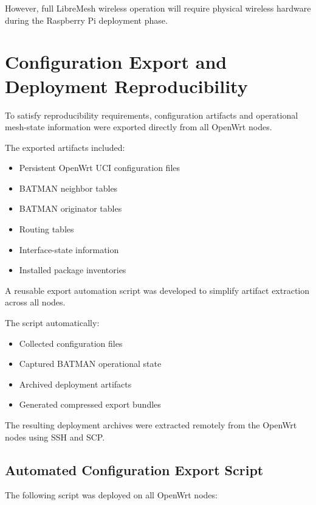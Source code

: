 \documentclass[conference]{IEEEtran}
\begin{document}
However, full LibreMesh wireless operation will require physical wireless hardware during the Raspberry Pi deployment phase.

\section{Configuration Export and Deployment Reproducibility}

To satisfy reproducibility requirements, configuration artifacts and operational mesh-state information were exported directly from all OpenWrt nodes.

The exported artifacts included:

\begin{itemize}
    \item Persistent OpenWrt UCI configuration files
    \item BATMAN neighbor tables
    \item BATMAN originator tables
    \item Routing tables
    \item Interface-state information
    \item Installed package inventories
\end{itemize}

A reusable export automation script was developed to simplify artifact extraction across all nodes.

The script automatically:
\begin{itemize}
    \item Collected configuration files
    \item Captured BATMAN operational state
    \item Archived deployment artifacts
    \item Generated compressed export bundles
\end{itemize}

The resulting deployment archives were extracted remotely from the OpenWrt nodes using SSH and SCP.

\subsection{Automated Configuration Export Script}

The following script was deployed on all OpenWrt nodes:
\end{document}
